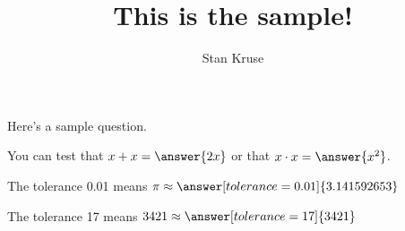 \documentclass{ximera}
\title{This is the sample!}
\author{Stan Kruse}
\begin{document}
\maketitle

Here's a sample question.

\begin{problem}
\begin{multipleChoice}
\end{multipleChoice}
\end{problem}

\begin{problem}
   You can test that $x + x = \answer{2x}$ or that $x \cdot x = \answer{x^2}$.
    \begin{problem}
    The tolerance 0.01 means $\pi \approx \answer[tolerance=0.01]{3.141592653}$
    \end{problem}
\end{problem}



\begin{problem}
   The tolerance 17 means $3421 \approx \answer[tolerance=17]{3421}$
\end{problem}
\end{document}
